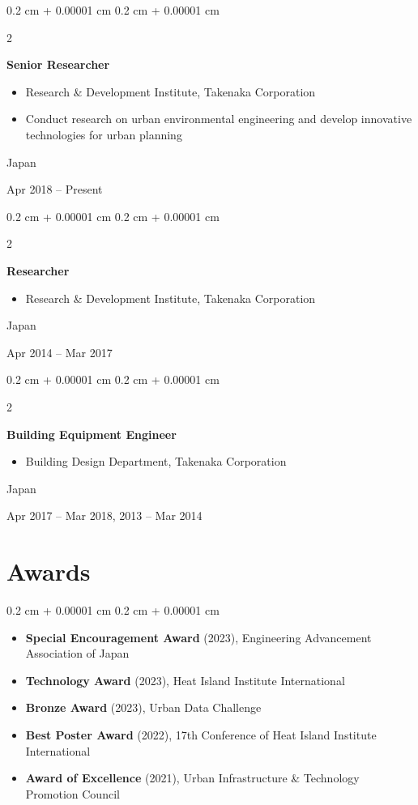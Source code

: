 \documentclass[10pt, letterpaper]{article}
\newenvironment{highlights}{
    \begin{itemize}[
        topsep=0.10 cm,
        parsep=0.10 cm,
        partopsep=0pt,
        itemsep=0pt,
        leftmargin=0.4 cm + 10pt
    ]
}{
    \end{itemize}
} %
\newenvironment{highlightsforbulletentries}{
    \begin{itemize}[
        topsep=0.10 cm,
        parsep=0.10 cm,
        partopsep=0pt,
        itemsep=0pt,
        leftmargin=10pt
    ]
}{
    \end{itemize}
} %
\newenvironment{onecolentry}{
    \begin{adjustwidth}{
        0.2 cm + 0.00001 cm
    }{
        0.2 cm + 0.00001 cm
    }
}{
    \end{adjustwidth}
} %
\newenvironment{twocolentry}[2][]{
    \onecolentry
    \def\secondColumn{#2}
    \setcolumnwidth{\fill, 4.5 cm}
    \begin{paracol}{2}
}{
    \switchcolumn \raggedleft \secondColumn
    \end{paracol}
    \endonecolentry
} %
\begin{document}
    \begin{twocolentry}{
        Japan

        Apr 2018 – Present
    }
        \textbf{Senior Researcher}
        \begin{highlights}
            \item Research \& Development Institute, Takenaka Corporation
            \item Conduct research on urban environmental engineering and develop innovative technologies for urban planning
        \end{highlights}
    \end{twocolentry}

    \begin{twocolentry}{
        Japan

        Apr 2014 – Mar 2017
    }
        \textbf{Researcher}
        \begin{highlights}
            \item Research \& Development Institute, Takenaka Corporation
        \end{highlights}
    \end{twocolentry}

    \begin{twocolentry}{
        Japan

        Apr 2017 – Mar 2018, 2013 – Mar 2014
    }
        \textbf{Building Equipment Engineer}
        \begin{highlights}
            \item Building Design Department, Takenaka Corporation
        \end{highlights}
    \end{twocolentry}

    \section{Awards}

    \begin{onecolentry}
        \begin{highlightsforbulletentries}
            \item \textbf{Special Encouragement Award} (2023), Engineering Advancement Association of Japan
            \item \textbf{Technology Award} (2023), Heat Island Institute International
            \item \textbf{Bronze Award} (2023), Urban Data Challenge
            \item \textbf{Best Poster Award} (2022), 17th Conference of Heat Island Institute International
            \item \textbf{Award of Excellence} (2021), Urban Infrastructure \& Technology Promotion Council
        \end{highlightsforbulletentries}
    \end{onecolentry}
\end{document}

